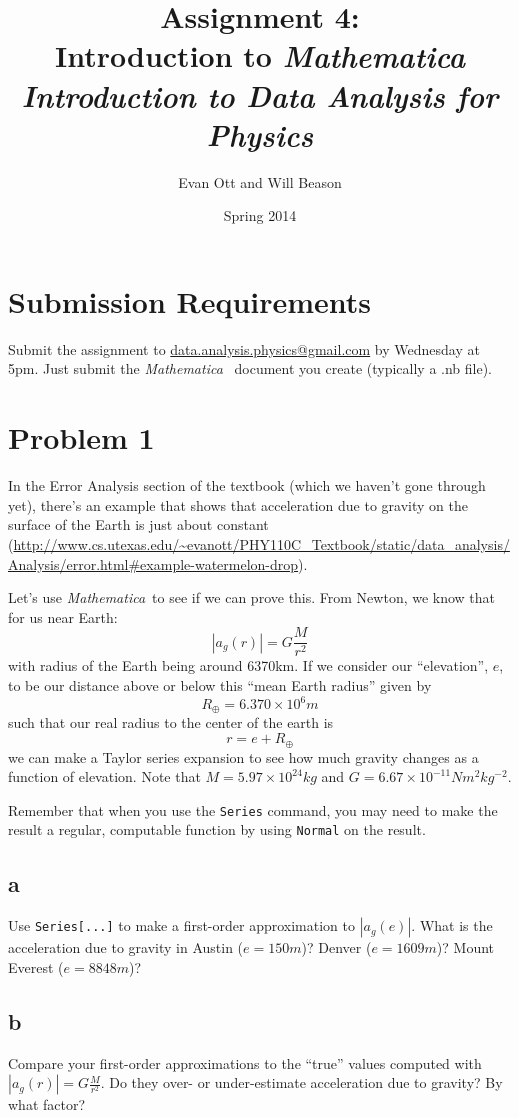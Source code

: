 \documentclass{article}
\title{Assignment 4: \\ Introduction to \emph{Mathematica}\\
\large \emph{Introduction to Data Analysis for Physics}}
\author{Evan Ott and Will Beason}
\date{Spring 2014}
\newcommand{\M}[0]{\emph{Mathematica}~}
\begin{document}
\maketitle
\section{Submission Requirements}
Submit the assignment to \href{mailto:data.analysis.physics@gmail.com}{data.analysis.physics@gmail.com} by Wednesday at 5pm. Just submit the \M
document you create (typically a .nb file).

\section{Problem 1}
In the Error Analysis section of the textbook (which we haven't gone through yet), there's an example that shows that acceleration due to gravity on the surface of the
Earth is just about constant (\url{http://www.cs.utexas.edu/~evanott/PHY110C_Textbook/static/data_analysis/Analysis/error.html#example-watermelon-drop}).

Let's use \M to see if we can prove this. From Newton, we know that for us near Earth: $$|a_g(r)|=G\frac{M}{r^2}$$ with radius of the Earth being around 6370km. If we consider
our ``elevation'', $e$, to be our distance above or below this ``mean Earth radius'' given by $$R_\oplus=6.370\times10^6m$$ such that our real radius to the center of the earth is $$r=e+R_\oplus$$
we can make a Taylor series expansion to see how much gravity changes as a function of elevation. Note that $M=5.97\times10^{24}kg$ and $G=6.67\times10^{-11}Nm^2kg^{-2}$.

Remember that when you use the \texttt{Series} command, you may need to make the result a regular, computable function by using \texttt{Normal} on the result.

\subsection{a}
Use \texttt{Series[...]} to make a first-order approximation to $|a_g(e)|$. What is the acceleration due to gravity in Austin ($e=150m$)? Denver ($e=1609m$)? Mount Everest ($e=8848m$)?

\subsection{b}
Compare your first-order approximations to the ``true'' values computed with $|a_g(r)|=G\frac{M}{r^2}$. Do they over- or under-estimate acceleration due to gravity? By what factor?
\end{document}
